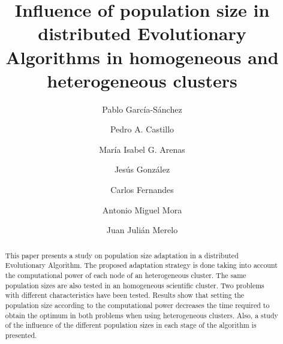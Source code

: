 \documentclass[final,1p,times]{elsarticle}
\begin{document}
\begin{frontmatter}



\title{Influence of population size in distributed Evolutionary Algorithms in homogeneous and heterogeneous clusters}


\author[ugr]{Pablo Garc\'ia-S\'anchez}
\author[ugr]{Pedro A. Castillo}
\author[ugr]{Mar\'ia Isabel G. Arenas}
\author[ugr]{Jes\'us Gonz\'alez}
\author[ugr]{Carlos Fernandes}
\author[ugr]{Antonio Miguel Mora}
\author[ugr]{Juan Juli\'an Merelo}

\address[ugr]{Department of Computer Architecture and Computer Technology and CITIC-UGR, University of Granada, Granada, Spain. Tel: +34958241778. Fax: +34958248993}

\begin{abstract}
This paper presents a study on population size adaptation in a distributed Evolutionary Algorithm. The proposed adaptation strategy is done taking into account the computational power of each node of an heterogeneous cluster. The same population sizes are also tested in an homogeneous scientific cluster. Two problems with different characteristics have been tested. Results show that setting the population size according to the computational power decreases the time required to obtain the optimum in both problems when using heterogeneous clusters. Also, a study of the influence of the different population sizes in each stage of the algorithm is presented.


\end{abstract}
\end{frontmatter}
\end{document}
